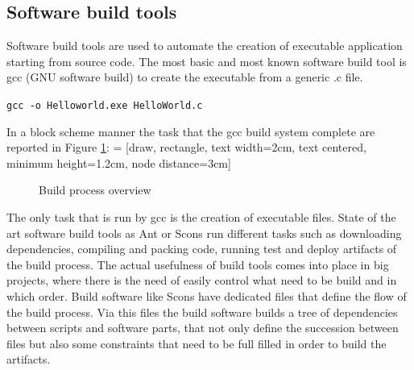 \documentclass[../main.tex]{subfiles}
\begin{document}
\subsection{Software build tools}\label{ssec:scons12}
Software build tools are used to automate the creation of executable application starting from source code. The most basic and most known software build tool is gcc (GNU software build) to create the executable from a generic .c file. 
\begin{center}
    \texttt{gcc -o Helloworld.exe HelloWorld.c}
\end{center}
In a block scheme manner the task that the gcc build system complete are reported in Figure \ref{Buildpro}:
 = [draw, rectangle, text width=2cm, text centered, minimum height=1.2cm, node distance=3cm]
\begin{figure}[h]
  \centering
{}
  \caption{Build process overview}
  \label{Buildpro}
\end{figure}
The only task that is run by gcc is the creation of executable files. State of the art software build tools as Ant or Scons run different tasks such as downloading dependencies, compiling and packing code, running test and deploy artifacts of the build process. The actual usefulness of build tools comes into place in big projects, where there is the need of easily control what need to be build and in which order. Build software like Scons have dedicated files that define the flow of the build process. Via this files the build software builds a tree of dependencies between scripts and software parts, that not only define the succession between files but also some constraints that need to be full filled in order to build the artifacts.\\
\end{document}
